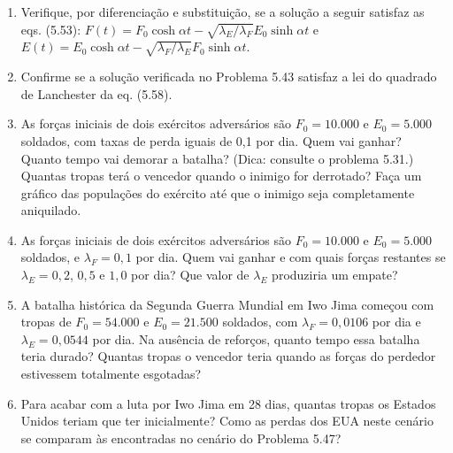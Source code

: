 \begin{enumerate}
    \item[\textbf{Problema 5.43.}] Verifique, por diferenciação e substituição, se a solução a seguir satisfaz as eqs. (5.53): $F(t) = F_0 \cosh \alpha t - \sqrt{\lambda_E / \lambda_F} E_0 \sinh \alpha t$ e $E(t) = E_0 \cosh \alpha t - \sqrt{\lambda_F / \lambda_E} F_0 \sinh \alpha t$.

    \item[\textbf{Problema 5.44.}] Confirme se a solução verificada no Problema 5.43 satisfaz a lei do quadrado de Lanchester da eq. (5.58).

    \item[\textbf{Problema 5.45.}] As forças iniciais de dois exércitos adversários são $F_0 = 10.000$ e $E_0 = 5.000$ soldados, com taxas de perda iguais de 0,1 por dia. Quem vai ganhar? Quanto tempo vai demorar a batalha? (Dica: consulte o problema 5.31.) Quantas tropas terá o vencedor quando o inimigo for derrotado? Faça um gráfico das populações do exército até que o inimigo seja completamente aniquilado.

    \item[\textbf{Problema 5.46.}] As forças iniciais de dois exércitos adversários são $F_0 = 10.000$ e $E_0 = 5.000$ soldados, e $\lambda_F = 0,1$ por dia. Quem vai ganhar e com quais forças restantes se $\lambda_E = 0,2$, $0,5$ e $1,0$ por dia? Que valor de $\lambda_E$ produziria um empate?

    \item[\textbf{Problema 5.47.}] A batalha histórica da Segunda Guerra Mundial em Iwo Jima começou com tropas de $F_0 = 54.000$ e $E_0 = 21.500$ soldados, com $\lambda_F = 0,0106$ por dia e $\lambda_E = 0,0544$ por dia. Na ausência de reforços, quanto tempo essa batalha teria durado? Quantas tropas o vencedor teria quando as forças do perdedor estivessem totalmente esgotadas?

    \item[\textbf{Problema 5.48.}] Para acabar com a luta por Iwo Jima em 28 dias, quantas tropas os Estados Unidos teriam que ter inicialmente? Como as perdas dos EUA neste cenário se comparam às encontradas no cenário do Problema 5.47?
\end{enumerate}
